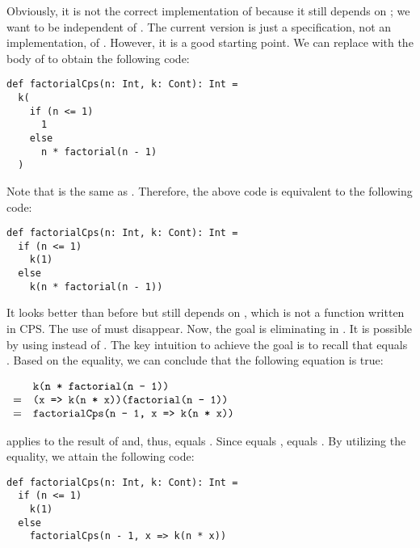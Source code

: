 Obviously, it is not the correct implementation of  because
it still depends on ; we want  to be
independent of .
The current version is just a specification, not an implementation, of .
However, it is a good starting point. We can replace  with
the body of  to obtain the following code:

\begin{verbatim}
def factorialCps(n: Int, k: Cont): Int =
  k(
    if (n <= 1)
      1
    else
      n * factorial(n - 1)
  )
\end{verbatim}

Note that  is the same as . Therefore, the above code is equivalent to the following code:

\begin{verbatim}
def factorialCps(n: Int, k: Cont): Int =
  if (n <= 1)
    k(1)
  else
    k(n * factorial(n - 1))
\end{verbatim}

It looks better than before but still depends on , which is not
a function written in CPS. The use of  must disappear. Now, the
goal is eliminating  in . It is
possible by using  instead of . The key
intuition to achieve the goal is to recall that  equals
. Based on the equality, we can conclude that the following
equation is true:

$
\begin{array}{cl}
& \texttt{k(n * factorial(n - 1))} \\
= & \texttt{(x => k(n * x))(factorial(n - 1))} \\
= & \texttt{factorialCps(n - 1, x => k(n * x))} \\
\end{array}
$

 applies  to the
result of  and, thus, equals . Since  equals ,
 equals
. By utilizing the equality, we attain
the following code:

\begin{verbatim}
def factorialCps(n: Int, k: Cont): Int =
  if (n <= 1)
    k(1)
  else
    factorialCps(n - 1, x => k(n * x))
\end{verbatim}

